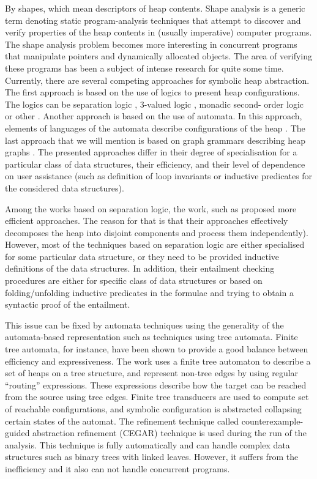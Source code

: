By shapes, which mean descriptors of heap contents. Shape analysis is a generic term denoting static
program-analysis techniques that attempt to discover and verify properties of the heap contents in (usually imperative) computer programs. The shape analysis problem becomes more interesting in concurrent programs that manipulate pointers and dynamically allocated objects. The area of verifying these programs has been a subject of intense research for quite some time. Currently, there are several competing approaches for symbolic heap abstraction. The first approach is based on the use of logics to present heap configurations. The logics can be separation logic \cite{John:SL, Stephen:SL,JoshCris:SL,Hongseok:SL,Kamil:SL,Chin:SL,Quang:SL, Ruzica:SL, Constrantin:SL}, 3-valued logic \cite{SagivRW02}, monadic second- order logic \cite{Ander:ML, Jakob:ML,Madhusudan:ML} or other \cite{Shmuel:Shape, Karen:Shape}. Another approach is based on the use of automata. In this approach, elements of languages of the automata describe configurations of the heap \cite{Ahmed:TreeAutomata, Ahmed:TreeAutomata2}. The last approach that we will mention is based on graph grammars describing heap graphs \cite{Jonathan:Shape, Jonathan:Grammars}. The presented approaches differ in their degree of specialisation for a particular class of data structures, their efficiency, and their level of dependence on user assistance (such as definition of loop invariants or inductive predicates for the considered data structures). 
  
Among the works based on separation logic, the work, such as \cite{JoshCris:SL,Hongseok:SL, Quang:SL} proposed more efficient approaches. The reason for that is that their approaches effectively decomposes the heap into disjoint components and process them independently). However, most of the techniques based on separation logic are either specialised for some particular data structure, or they need to be provided inductive definitions of the data structures. In addition, their entailment checking procedures are either for specific class of data structures or based on folding/unfolding inductive predicates in the formulae and trying to obtain a syntactic proof of the entailment. 

This issue can be fixed by automata techniques using the generality of the automata-based representation such as techniques using tree automata. Finite tree automata, for instance, have been shown to provide a good balance between efficiency and expressiveness. The work \cite{Ahmed:TreeAutomata} uses a finite tree automaton to describe a set of heaps on a tree structure,
and represent non-tree edges by using regular “routing” expressions. These expressions
describe how the target can be reached from the source using tree edges. Finite tree transducers
are used to compute set of reachable configurations, and symbolic configuration is abstracted
collapsing certain states of the automat. The refinement technique called counterexample-guided
abstraction refinement (CEGAR) technique is used during the run of the analysis. This technique
is fully automatically and can handle complex data structures such as binary trees with linked
leaves. However, it suffers from the inefficiency and it also can not handle concurrent programs.

